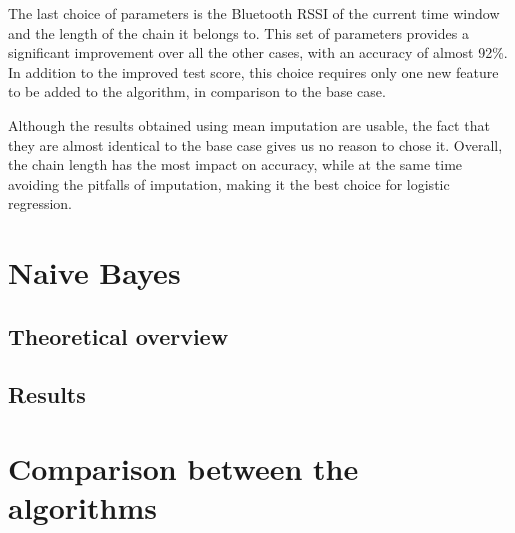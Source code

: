 The last choice of parameters is the Bluetooth RSSI of the current time window and the length of the chain it belongs to. This set of parameters provides a significant improvement over all the other cases, with an accuracy of almost 92\%. In addition to the improved test score, this choice requires only one new feature to be added to the algorithm, in comparison to the base case.

Although the results obtained using mean imputation are usable, the fact that they are almost identical to the base case gives us no reason to chose it. Overall, the chain length has the most impact on accuracy, while at the same time avoiding the pitfalls of imputation, making it the best choice for logistic regression. 

\section{Naive Bayes}

\subsection{Theoretical overview}

\subsection{Results}

\section {Comparison between the algorithms}